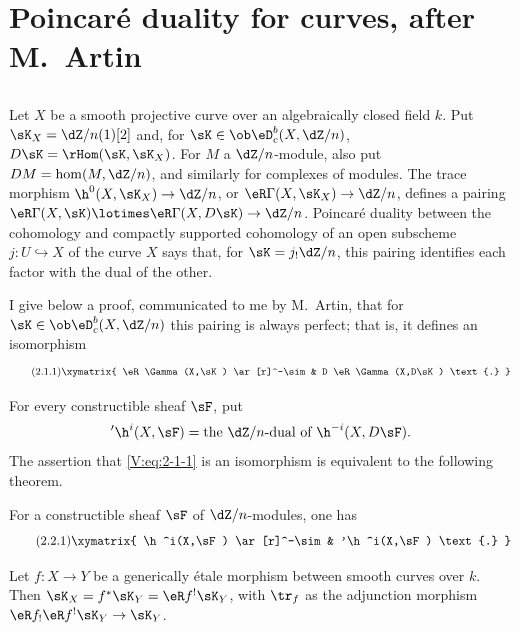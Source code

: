 \documentclass[oneside]{book}
\begin{document}
\section{Poincaré duality for curves, after M.\ Artin}\label{V:2}


\subsection{}\label{V:2-1}

Let $X$ be a smooth projective curve over an algebraically closed field $k$.
Put $\sK_X=\dZ/n(1)[2]$ and, for $\sK\in\ob \eD_c^b(X,\dZ/n)$,
$D\sK=\rHom(\sK,\sK_X)$. For $M$ a $\dZ/n$-module, also put
$D M = \hom(M,\dZ/n)$, and similarly for complexes of modules. The trace
morphism $\h^0(X,\sK_X) \to \dZ/n$, or
$\eR\Gamma(X,\sK_X)\to \dZ/n$, defines a pairing
$\eR\Gamma(X,\sK)\lotimes\eR\Gamma(X,D\sK) \to \dZ/n$. Poincaré duality
between the cohomology and compactly supported cohomology of an open
subscheme $j:U\hookrightarrow X$ of the curve $X$ says that, for
$\sK=j_!\dZ/n$, this pairing identifies each factor with the dual of the
other.

I give below a proof, communicated to me by M.\ Artin, that for
$\sK\in\ob\eD_c^b(X,\dZ/n)$ this pairing is always perfect; that is, it
defines an isomorphism
\begin{equation*}\tag{2.1.1}\label{V:eq:2-1-1}
\xymatrix{
  \eR\Gamma(X,\sK) \ar[r]^-\sim
    & D \eR\Gamma(X,D\sK) \text{.}
}
\end{equation*}

For every constructible sheaf $\sF$, put
\[
  '\h^i(X,\sF) = \text{the $\dZ/n$-dual of $\h^{-i}(X,D\sF)$.}
\]
The assertion that \eqref{V:eq:2-1-1} is an isomorphism is equivalent to the
following theorem.


\begin{theorem_}\label{V:2-2}
For a constructible sheaf $\sF$ of $\dZ/n$-modules, one has
\begin{equation*}\tag{2.2.1}\label{V:eq:2-2-1}
\xymatrix{
  \h^i(X,\sF) \ar[r]^-\sim
    & '\h^i(X,\sF) \text{.}
}
\end{equation*}
\end{theorem_}


\begin{lemma_}\label{V:2-3}
Let $f:X\to Y$ be a generically étale morphism between smooth curves over
$k$. Then $\sK_X=f^\ast\sK_Y=\eR f^!\sK_Y$, with $\tr_f$ as the adjunction
morphism $\eR f_!\eR f^!\sK_Y\to \sK_Y$.
\end{lemma_}
\end{document}
